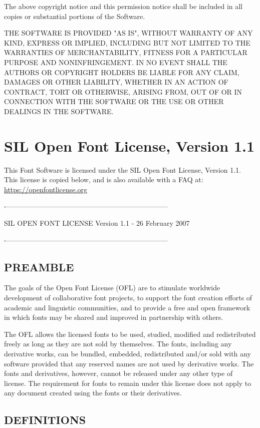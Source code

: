 The above copyright notice and this permission notice shall be included in all copies or substantial portions of the Software.

THE SOFTWARE IS PROVIDED "AS IS", WITHOUT WARRANTY OF ANY KIND, EXPRESS OR IMPLIED, INCLUDING BUT NOT LIMITED TO THE WARRANTIES OF MERCHANTABILITY, FITNESS FOR A PARTICULAR PURPOSE AND NONINFRINGEMENT. IN NO EVENT SHALL THE AUTHORS OR COPYRIGHT HOLDERS BE LIABLE FOR ANY CLAIM, DAMAGES OR OTHER LIABILITY, WHETHER IN AN ACTION OF CONTRACT, TORT OR OTHERWISE, ARISING FROM, OUT OF OR IN CONNECTION WITH THE SOFTWARE OR THE USE OR OTHER DEALINGS IN THE SOFTWARE.

\section{SIL Open Font License, Version 1.1}

This Font Software is licensed under the SIL Open Font License, Version 1.1.
This license is copied below, and is also available with a FAQ at:
\url{https://openfontlicense.org}
 
-———————————————————————

SIL OPEN FONT LICENSE Version 1.1 - 26 February 2007

-———————————————————————

\subsection{PREAMBLE}

The goals of the Open Font License (OFL) are to stimulate worldwide development of collaborative font projects, to support the font creation efforts of academic and linguistic communities, and to provide a free and open framework in which fonts may be shared and improved in partnership with others.

The OFL allows the licensed fonts to be used, studied, modified and redistributed freely as long as they are not sold by themselves. The fonts, including any derivative works, can be bundled, embedded, redistributed and/or sold with any software provided that any reserved names are not used by derivative works. The fonts and derivatives, however, cannot be released under any other type of license. The requirement for fonts to remain under this license does not apply to any document created using the fonts or their derivatives.

\subsection{DEFINITIONS}

